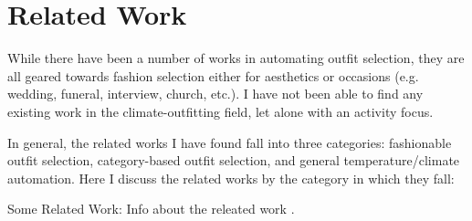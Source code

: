 \section{Related Work}
\label{section:relatedwork}
While there have been a number of works in automating outfit selection, they are all geared towards
fashion selection either for aesthetics or occasions (e.g. wedding, funeral, interview, church, etc.).
I have not been able to find any existing work in the climate-outfitting field, let alone with an
activity focus.

In general, the related works I have found fall into three categories: fashionable outfit selection, category-based 
outfit selection, and general temperature/climate automation. Here I discuss the related works by the category in which
they fall:

\begin{description}
  \item{Some Related Work:} Info about the releated work \cite{JML:J832}.
\end{description}

